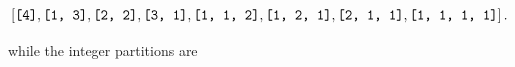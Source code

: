 \begin{align*}  
\left[\text{\texttt{[4]}}, \text{\texttt{[1,{ }3]}}, \text{\texttt{[2,{ }2]}}, \text{\texttt{[3,{ }1]}}, \text{\texttt{[1,{ }1,{ }2]}}, \text{\texttt{[1,{ }2,{ }1]}}, \text{\texttt{[2,{ }1,{ }1]}}, \text{\texttt{[1,{ }1,{ }1,{ }1]}}\right]
.\end{align*}

while the integer partitions are

\begin{Shaded}
\begin{Highlighting}[]
  \OperatorTok{*}
\NormalTok{(}\NormalTok{(}\OperatorTok{=}\NormalTok{))}
\end{Highlighting}
\end{Shaded}

